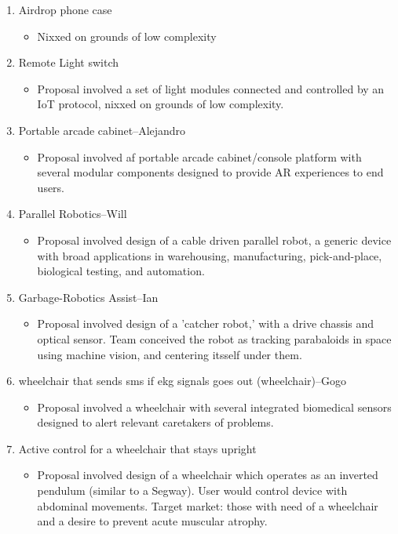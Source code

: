 \documentclass[11pt]{article}
\begin{document}
\begin{enumerate}
\item Airdrop phone case
\begin{itemize}
\item Nixxed on grounds of low complexity
\end{itemize}
\item Remote Light switch
\begin{itemize}
\item Proposal involved a set of light modules connected and controlled by an IoT protocol, nixxed on grounds of low complexity.
\end{itemize}
\item Portable arcade cabinet–Alejandro
\begin{itemize}
\item Proposal involved af portable arcade cabinet/console platform with several modular components designed to provide AR experiences to end users.
\end{itemize}
\item Parallel Robotics–Will
\begin{itemize}
\item Proposal involved design of a cable driven parallel robot, a generic device with broad applications in warehousing, manufacturing, pick-and-place, biological testing, and automation.
\end{itemize}
\item Garbage-Robotics Assist–Ian
\begin{itemize}
\item Proposal involved design of a 'catcher robot,' with a drive chassis and optical sensor. Team conceived the robot as tracking parabaloids in space using machine vision, and centering itsself under them.
\end{itemize}
\item wheelchair that sends sms if ekg signals goes out (wheelchair)--Gogo
\begin{itemize}
\item Proposal involved a wheelchair with several integrated biomedical sensors designed to alert relevant caretakers of problems.
\end{itemize}
\item Active control for a wheelchair that stays upright
\begin{itemize}
\item Proposal involved design of a wheelchair which operates as an inverted pendulum (similar to a Segway). User would control device with abdominal movements. Target market: those with need of a wheelchair and a desire to prevent acute muscular atrophy.

\end{itemize}
\end{enumerate}
\end{document}
